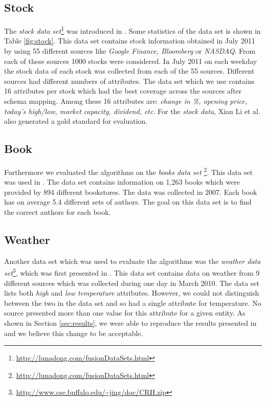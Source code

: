 \documentclass{acm_proc_article-sp}
\begin{document}
\subsection{Stock}

The \emph{stock data set}\footnote{\url{http://lunadong.com/fusionDataSets.html}} was introduced in \cite{li:truth}. Some statistics of the data set is shown in Table \ref{fig:stock}. This data set contains stock information obtained in July 2011 by using 55 different sources like \emph{Google Finance, Bloomberg} or \emph{NASDAQ}. From each of these sources 1000 stocks were considered. In July 2011 on each weekday the stock data of each stock was collected from each of the 55 sources. Different sources had different numbers of attributes. The data set which we use contains 16 attributes per stock which had the best coverage across the sources after schema mapping. Among these 16 attributes are: \emph{change in \%, opening price, today's high/low, market capacity, dividend, etc}. For the \emph{stock data}, {Xian Li et al.} \cite{li:truth} also generated a gold standard for evaluation.

\subsection{Book}

Furthermore we evaluated the algorithms on the \emph{books data set} \footnote{\url{http://lunadong.com/fusionDataSets.html}}. This data set was used in \cite{yin:truth}. The data set contains information on 1,263 books which were provided by 894 different bookstores. The data was collected in 2007. Each book has on average 5.4 different sets of authors. The goal on this data set is to find the correct authors for each book.

\subsection{Weather}

Another data set which was used to evaluate the algorithms was the \emph{weather data set}\footnote{\url{http://www.cse.buffalo.edu/~jing/doc/CRH.zip}}, which was first presented in \cite{li:resolving}. This data set contains data on weather from 9 different sources which was collected during one day in March 2010. The data set lists both \emph{high} and \emph{low temperature} attributes. However, we could not distinguish between the two in the data set and so had a single attribute for temperature. No source presented more than one value for this attribute for a given entity. As shown in Section \ref{sec:results}, we were able to reproduce the results presented in \cite{li:resolving} and we believe this change to be acceptable. 
\end{document}
